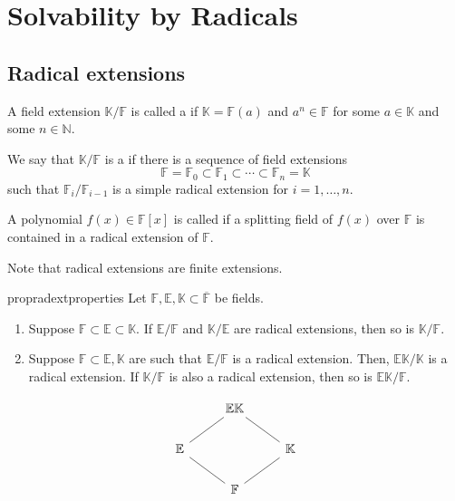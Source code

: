 \chapter{Solvability by Radicals}

\section{Radical extensions}

\begin{defn}%
	A field extension $\mathbb{K}/\mathbb{F}$ is called a  if $\mathbb{K} = \mathbb{F}(a)$ and $a^n \in \mathbb{F}$ for some $a \in \mathbb{K}$ and some $n \in \mathbb{N}.$

	We say that $\mathbb{K}/\mathbb{F}$ is a  if there is a sequence of field extensions
	\begin{equation*} 
		\mathbb{F} = \mathbb{F}_0 \subset \mathbb{F}_1 \subset \cdots \subset \mathbb{F}_n = \mathbb{K}
	\end{equation*}
	such that $\mathbb{F}_i/\mathbb{F}_{i - 1}$ is a simple radical extension for $i = 1, \ldots, n.$

	A polynomial $f(x) \in \mathbb{F}[x]$ is called  if a splitting field of $f(x)$ over $\mathbb{F}$ is contained in a radical extension of $\mathbb{F}.$
\end{defn}

\begin{rem}
	Note that radical extensions are finite extensions.
\end{rem}

\begin{restatable}[]{prop}{radextproperties}
\label{prop:radextproperties}
	Let $\mathbb{F}, \mathbb{E}, \mathbb{K} \subset \overline{\mathbb{F}}$ be fields. 
	\begin{enumerate}
		\item Suppose $\mathbb{F} \subset \mathbb{E} \subset \mathbb{K}.$ If $\mathbb{E}/\mathbb{F}$ and $\mathbb{K}/\mathbb{E}$ are radical extensions, then so is $\mathbb{K}/\mathbb{F}.$ 
		\item Suppose $\mathbb{F} \subset \mathbb{E}, \mathbb{K}$ are such that $\mathbb{E}/\mathbb{F}$ is a radical extension. Then, $\mathbb{E}\mathbb{K}/\mathbb{K}$ is a radical extension. If $\mathbb{K}/\mathbb{F}$ is also a radical extension, then so is $\mathbb{E}\mathbb{K}/\mathbb{F}.$ 
	\end{enumerate}
	\begin{equation*} 
		\begin{tikzcd}[ampersand replacement=\&]
			\& \mathbb{E}\mathbb{K}                               \&                                \\
			\mathbb{E} \arrow[ru, no head] \&                                                    \& \mathbb{K} \arrow[lu, no head] \\
			\& \mathbb{F} \arrow[ru, no head] \arrow[lu, no head] \& 
		\end{tikzcd}
	\end{equation*}
	\hfill\hyperref[prop:radextproperties2]{\downsym}
\end{restatable}

